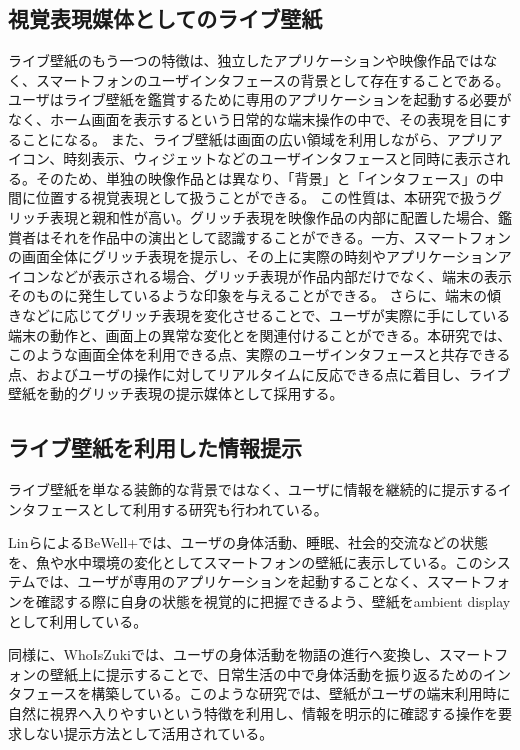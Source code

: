 \subsection{視覚表現媒体としてのライブ壁紙}
ライブ壁紙のもう一つの特徴は、独立したアプリケーションや映像作品ではなく、スマートフォンのユーザインタフェースの背景として存在することである。ユーザはライブ壁紙を鑑賞するために専用のアプリケーションを起動する必要がなく、ホーム画面を表示するという日常的な端末操作の中で、その表現を目にすることになる。
また、ライブ壁紙は画面の広い領域を利用しながら、アプリアイコン、時刻表示、ウィジェットなどのユーザインタフェースと同時に表示される。そのため、単独の映像作品とは異なり、「背景」と「インタフェース」の中間に位置する視覚表現として扱うことができる。
この性質は、本研究で扱うグリッチ表現と親和性が高い。グリッチ表現を映像作品の内部に配置した場合、鑑賞者はそれを作品中の演出として認識することができる。一方、スマートフォンの画面全体にグリッチ表現を提示し、その上に実際の時刻やアプリケーションアイコンなどが表示される場合、グリッチ表現が作品内部だけでなく、端末の表示そのものに発生しているような印象を与えることができる。
さらに、端末の傾きなどに応じてグリッチ表現を変化させることで、ユーザが実際に手にしている端末の動作と、画面上の異常な変化とを関連付けることができる。本研究では、このような画面全体を利用できる点、実際のユーザインタフェースと共存できる点、およびユーザの操作に対してリアルタイムに反応できる点に着目し、ライブ壁紙を動的グリッチ表現の提示媒体として採用する。



\subsection{ライブ壁紙を利用した情報提示}

ライブ壁紙を単なる装飾的な背景ではなく、ユーザに情報を継続的に提示するインタフェースとして利用する研究も行われている。

LinらによるBeWell+では、ユーザの身体活動、睡眠、社会的交流などの状態を、魚や水中環境の変化としてスマートフォンの壁紙に表示している\cite{lin2012bewellplus}。このシステムでは、ユーザが専用のアプリケーションを起動することなく、スマートフォンを確認する際に自身の状態を視覚的に把握できるよう、壁紙をambient displayとして利用している。

同様に、WhoIsZukiでは、ユーザの身体活動を物語の進行へ変換し、スマートフォンの壁紙上に提示することで、日常生活の中で身体活動を振り返るためのインタフェースを構築している\cite{murnane2020narrative}。このような研究では、壁紙がユーザの端末利用時に自然に視界へ入りやすいという特徴を利用し、情報を明示的に確認する操作を要求しない提示方法として活用されている。

